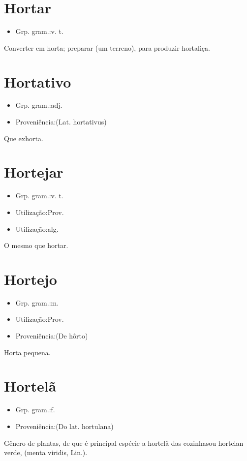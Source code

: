 \documentclass{article}
\begin{document}
\section{Hortar}
\begin{itemize}
\item {Grp. gram.:v. t.}
\end{itemize}
Converter em horta; preparar (um terreno), para produzir hortaliça.
\section{Hortativo}
\begin{itemize}
\item {Grp. gram.:adj.}
\end{itemize}
\begin{itemize}
\item {Proveniência:(Lat. \textunderscore hortativus\textunderscore )}
\end{itemize}
Que exhorta.
\section{Hortejar}
\begin{itemize}
\item {Grp. gram.:v. t.}
\end{itemize}
\begin{itemize}
\item {Utilização:Prov.}
\end{itemize}
\begin{itemize}
\item {Utilização:alg.}
\end{itemize}
O mesmo que \textunderscore hortar\textunderscore .
\section{Hortejo}
\begin{itemize}
\item {Grp. gram.:m.}
\end{itemize}
\begin{itemize}
\item {Utilização:Prov.}
\end{itemize}
\begin{itemize}
\item {Proveniência:(De \textunderscore hôrto\textunderscore )}
\end{itemize}
Horta pequena.
\section{Hortelã}
\begin{itemize}
\item {Grp. gram.:f.}
\end{itemize}
\begin{itemize}
\item {Proveniência:(Do lat. \textunderscore hortulana\textunderscore )}
\end{itemize}
Gênero de plantas, de que é principal espécie a \textunderscore hortelã das cozinhas\textunderscore  ou \textunderscore hortelan verde\textunderscore , (\textunderscore menta viridis\textunderscore , Lin.).
\end{document}
